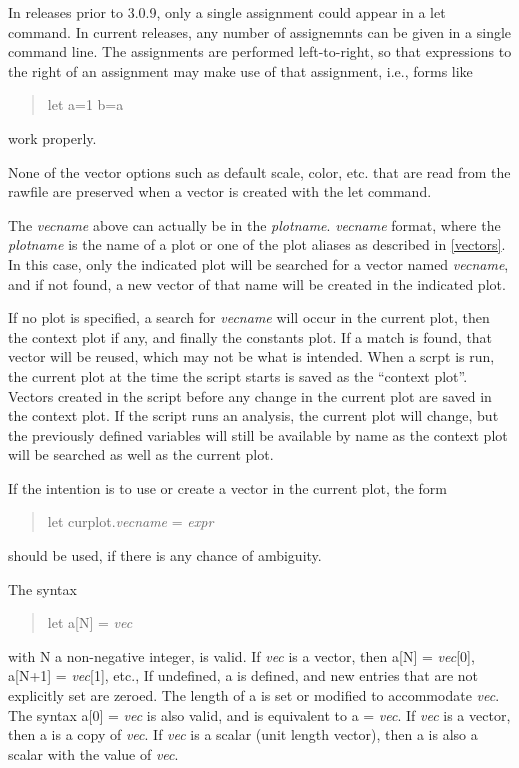 In {\WRspice} releases prior to 3.0.9, only a single assignment could
appear in a {\cb let} command.  In current releases, any number of
assignemnts can be given in a single command line.  The assignments
are performed left-to-right, so that expressions to the right of an
assignment may make use of that assignment, i.e., forms like
\begin{quote}
\vt let a=1 b=a
\end{quote}
work properly.

None of the vector options such as default scale, color, etc.  that
are read from the rawfile are preserved when a vector is created with
the {\cb let} command.

The {\it vecname} above can actually be in the {\it plotname\/}.{\it
vecname} format, where the {\it plotname} is the name of a plot or one
of the plot aliases as described in \ref{vectors}.  In this case, only
the indicated plot will be searched for a vector named {\it
vecname\/}, and if not found, a new vector of that name will be
created in the indicated plot.

If no plot is specified, a search for {\it vecname} will occur in the
current plot, then the context plot if any, and finally the {\vt
constants} plot.  If a match is found, that vector will be reused,
which may not be what is intended.  When a scrpt is run, the current
plot at the time the script starts is saved as the ``context plot''. 
Vectors created in the script before any change in the current plot
are saved in the context plot.  If the script runs an analysis, the
current plot will change, but the previously defined variables will
still be available by name as the context plot will be searched as
well as the current plot.

If the intention is to use or create a vector in the current plot,
the form
\begin{quote}
{\vt let curplot}.{\it vecname} {\vt =} {\it expr}
\end{quote}
should be used, if there is any chance of ambiguity.

The syntax
\begin{quote}
{\vt let a[N] = {\it vec\/}}
\end{quote}
with {\vt N} a non-negative integer, is valid.  If {\it vec\/} is a
vector, then {\vt a[N] = {\it vec\/}[0]}, {\vt a[N+1] = {\it
vec\/}[1]}, etc., If undefined, {\vt a} is defined, and new entries
that are not explicitly set are zeroed.  The length of {\vt a} is set
or modified to accommodate {\it vec\/}.  The syntax {\vt a[0] = {\it
vec\/}} is also valid, and is equivalent to {\vt a = {\it vec\/}}.  If
{\it vec\/} is a vector, then {\vt a} is a copy of {\it vec\/}.  If
{\it vec\/} is a scalar (unit length vector), then {\vt a} is also a
scalar with the value of {\it vec\/}. 

